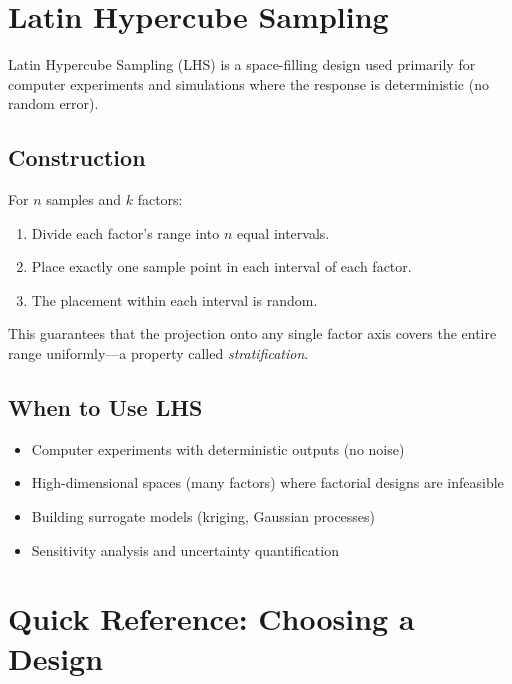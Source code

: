 \documentclass[11pt]{book}
\begin{document}
\section{Latin Hypercube Sampling}

Latin Hypercube Sampling (LHS) is a space-filling design used primarily for
computer experiments and simulations where the response is deterministic (no
random error).

\subsection{Construction}

For $n$ samples and $k$ factors:
\begin{enumerate}[nosep]
\item Divide each factor's range into $n$ equal intervals.
\item Place exactly one sample point in each interval of each factor.
\item The placement within each interval is random.
\end{enumerate}

This guarantees that the projection onto any single factor axis covers the
entire range uniformly---a property called \emph{stratification}.

\subsection{When to Use LHS}

\begin{itemize}[nosep]
\item Computer experiments with deterministic outputs (no noise)
\item High-dimensional spaces (many factors) where factorial designs are infeasible
\item Building surrogate models (kriging, Gaussian processes)
\item Sensitivity analysis and uncertainty quantification
\end{itemize}


\section{Quick Reference: Choosing a Design}
\end{document}

